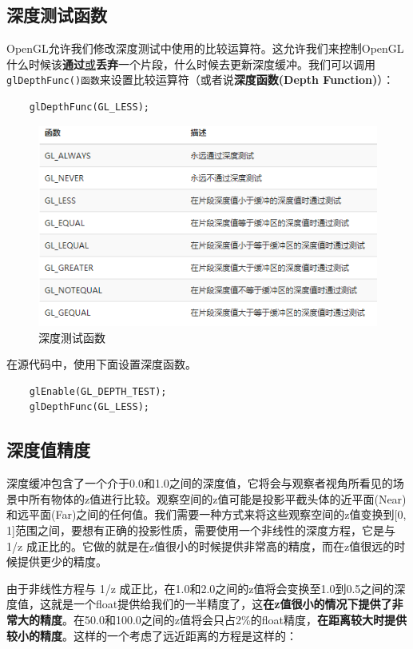 \documentclass[UTF8,a4paper,12pt]{ctexbook}
\begin{document}
		
		\subsection{深度测试函数}
			OpenGL允许我们修改深度测试中使用的比较运算符。这允许我们来控制OpenGL什么时候该\textbf{通过}\underline{或}\textbf{丢弃}一个片段，什么时候去更新深度缓冲。我们可以调用\verb|glDepthFunc()函数|来设置比较运算符（或者说\textbf{深度函数(Depth Function)}）：
			\begin{lstlisting}
	glDepthFunc(GL_LESS);			
			\end{lstlisting}
			
			\begin{figure}[H]
				\centering
				\includegraphics[width=.95\linewidth]{depthTestFunc}
				\caption{深度测试函数}
			\end{figure}
			
			
			在源代码中，使用下面设置深度函数。
			\begin{lstlisting}
	glEnable(GL_DEPTH_TEST);
	glDepthFunc(GL_LESS);			
			\end{lstlisting}
			
		\subsection{深度值精度}
			深度缓冲包含了一个介于0.0和1.0之间的深度值，它将会与观察者视角所看见的场景中所有物体的z值进行比较。观察空间的z值可能是投影平截头体的近平面(Near)和远平面(Far)之间的任何值。我们需要一种方式来将这些观察空间的z值变换到[0, 1]范围之间，要想有正确的投影性质，需要使用一个非线性的深度方程，它是与 1/z 成正比的。它做的就是在z值很小的时候提供非常高的精度，而在z值很远的时候提供更少的精度。
			
			由于非线性方程与 1/z 成正比，在1.0和2.0之间的z值将会变换至1.0到0.5之间的深度值，这就是一个float提供给我们的一半精度了，这\textbf{在z值很小的情况下提供了非常大的精度}。在50.0和100.0之间的z值将会只占2\%的float精度，\textbf{在距离较大时提供较小的精度}。这样的一个考虑了远近距离的方程是这样的：
			
\end{document}

